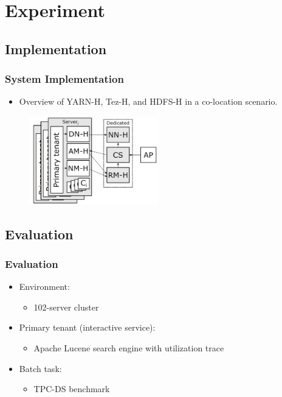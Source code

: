 \documentclass{beamer}
\begin{document}
\section{Experiment}

\subsection{Implementation}
	\begin{frame}
	\frametitle{System Implementation}
		\begin{itemize}
		\item Overview of YARN-H, Tez-H, and HDFS-H in a co-location scenario.
		\end{itemize}
		\begin{figure}[h!]
		\centering
		\includegraphics[width=0.5\textwidth]{./figure/implements.PNG}
		\end{figure}
	\end{frame}

\subsection{Evaluation}
	\begin{frame}
	\frametitle{Evaluation}
		\begin{itemize}
		\item Environment:
			\begin{itemize}
			\item 102-server cluster
			\end{itemize}
		\item Primary tenant (interactive service):
			\begin{itemize}
			\item Apache Lucene search engine with utilization trace
			\end{itemize}
		\item Batch task:
			\begin{itemize}
			\item TPC-DS benchmark
			\end{itemize}
		\end{itemize}
	\end{frame}
\end{document}
